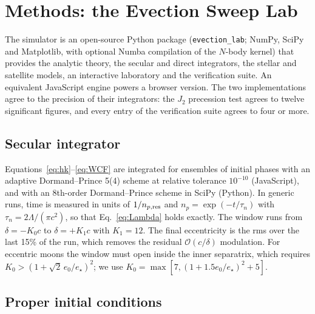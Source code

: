 \documentclass[11pt,a4paper]{article}
\newcommand{\estar}{e_\star}
\begin{document}
\section{Methods: the Evection Sweep Lab}\label{sec:methods}

The simulator is an open-source Python package (\texttt{evection\_lab}; NumPy, SciPy and Matplotlib, with optional Numba compilation of the $N$-body kernel) that provides the analytic theory, the secular and direct integrators, the stellar and satellite models, an interactive laboratory and the verification suite. An equivalent JavaScript engine powers a browser version. The two implementations agree to the precision of their integrators: the $J_2$ precession test agrees to twelve significant figures, and every entry of the verification suite agrees to four or more.

\subsection{Secular integrator}

Equations~\eqref{eq:hk}--\eqref{eq:WCF} are integrated for ensembles of initial phases with an adaptive Dormand--Prince 5(4) scheme \citep{Dormand1980} at relative tolerance $10^{-10}$ (JavaScript), and with an 8th-order Dormand--Prince scheme in SciPy (Python). In generic runs, time is measured in units of $1/n_{p,\rm res}$ and $n_p=\exp(-t/\tau_n)$ with $\tau_n=2\Lambda/(\pi c^2)$, so that Eq.~\eqref{eq:Lambda} holds exactly. The window runs from $\delta=-K_0c$ to $\delta=+K_1c$ with $K_1=12$. The final eccentricity is the rms over the last 15\% of the run, which removes the residual $\mathcal O(c/\delta)$ modulation. For eccentric moons the window must open inside the inner separatrix, which requires $K_0>(1+\sqrt2\,e_0/\estar)^2$; we use $K_0=\max[7,(1+1.5e_0/\estar)^2+5]$.

\subsection{Proper initial conditions}\label{sec:proper}
\end{document}

